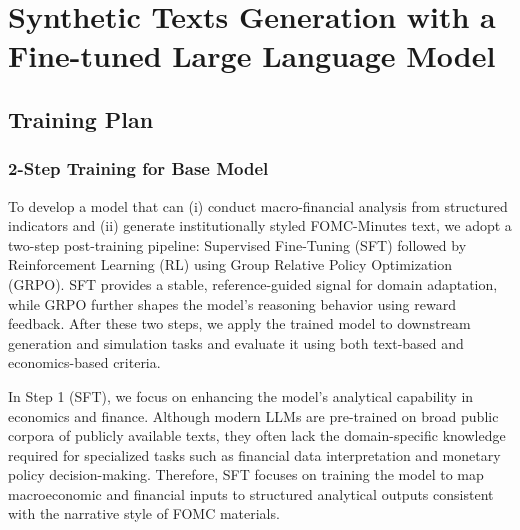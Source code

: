 \graphicspath{{Chapter2/Chapter2Figs/}{Chapter2/Chapter2Figs/}}
 
\chapter{Synthetic Texts Generation with a Fine-tuned Large Language Model}\label{ch:chapter:2}










\section{Training Plan}\label{ch2:sec:2-step-training}


\subsection*{2-Step Training for Base Model}
To develop a model that can (i) conduct macro-financial analysis from structured indicators and (ii) generate institutionally styled FOMC-Minutes text, we adopt a two-step post-training pipeline: Supervised Fine-Tuning (SFT) followed by Reinforcement Learning (RL) using Group Relative Policy Optimization (GRPO). SFT provides a stable, reference-guided signal for domain adaptation, while GRPO further shapes the model's reasoning behavior using reward feedback. After these two steps, we apply the trained model to downstream generation and simulation tasks and evaluate it using both text-based and economics-based criteria.


In Step 1 (SFT), we focus on enhancing the model's analytical capability in economics and finance. Although modern LLMs are pre-trained on broad public corpora of publicly available texts, they often lack the domain-specific knowledge required for specialized tasks such as financial data interpretation and monetary policy decision-making. Therefore, SFT focuses on training the model to map macroeconomic and financial inputs to structured analytical outputs consistent with the narrative style of FOMC materials.


